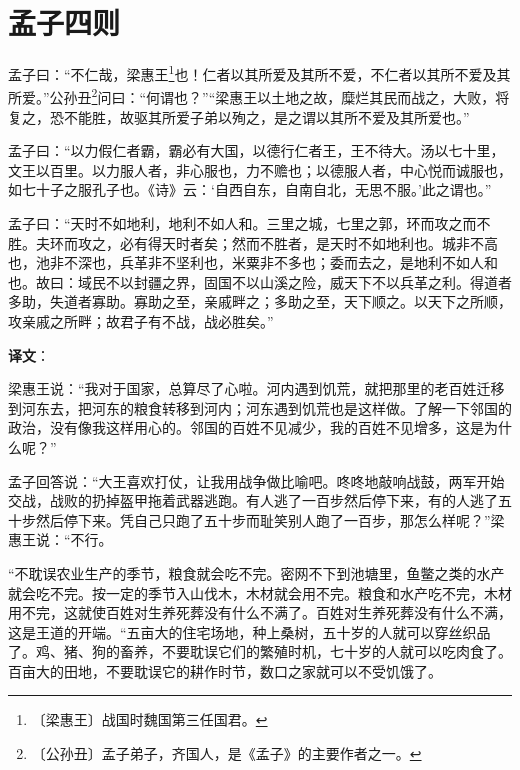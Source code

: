 \documentclass[12pt,UTF-8,openany]{ctexbook}
\begin{document}
\chapter{孟子四则}

\begin{normalsize}
    
    孟子曰：“不仁哉，梁惠王\footnote{〔梁惠王〕战国时魏国第三任国君。}也！仁者以其所爱及其所不爱，不仁者以其所不爱及其所爱。”公孙丑\footnote{〔公孙丑〕孟子弟子，齐国人，是《孟子》的主要作者之一。}问曰：“何谓也？”“梁惠王以土地之故，糜烂其民而战之，大败，将复之，恐不能胜，故驱其所爱子弟以殉之，是之谓以其所不爱及其所爱也。”
    
    孟子曰：“以力假仁者霸，霸必有大国，以德行仁者王，王不待大。汤以七十里，文王以百里。以力服人者，非心服也，力不赡也；以德服人者，中心悦而诚服也，如七十子之服孔子也。《诗》云：‘自西自东，自南自北，无思不服。’此之谓也。”
    
    孟子曰：“天时不如地利，地利不如人和。三里之城，七里之郭，环而攻之而不胜。夫环而攻之，必有得天时者矣；然而不胜者，是天时不如地利也。城非不高也，池非不深也，兵革非不坚利也，米粟非不多也；委而去之，是地利不如人和也。故曰：域民不以封疆之界，固国不以山溪之险，威天下不以兵革之利。得道者多助，失道者寡助。寡助之至，亲戚畔之；多助之至，天下顺之。以天下之所顺，攻亲戚之所畔；故君子有不战，战必胜矣。”
\end{normalsize}


\newpage

\textbf{译文}：

\vspace{1em}

\begin{normalsize}
    
    梁惠王说：“我对于国家，总算尽了心啦。河内遇到饥荒，就把那里的老百姓迁移到河东去，把河东的粮食转移到河内；河东遇到饥荒也是这样做。了解一下邻国的政治，没有像我这样用心的。邻国的百姓不见减少，我的百姓不见增多，这是为什么呢？”
    
    孟子回答说：“大王喜欢打仗，让我用战争做比喻吧。咚咚地敲响战鼓，两军开始交战，战败的扔掉盔甲拖着武器逃跑。有人逃了一百步然后停下来，有的人逃了五十步然后停下来。凭自己只跑了五十步而耻笑别人跑了一百步，那怎么样呢？”梁惠王说：“不行。
    
    “不耽误农业生产的季节，粮食就会吃不完。密网不下到池塘里，鱼鳖之类的水产就会吃不完。按一定的季节入山伐木，木材就会用不完。粮食和水产吃不完，木材用不完，这就使百姓对生养死葬没有什么不满了。百姓对生养死葬没有什么不满，这是王道的开端。“五亩大的住宅场地，种上桑树，五十岁的人就可以穿丝织品了。鸡、猪、狗的畜养，不要耽误它们的繁殖时机，七十岁的人就可以吃肉食了。百亩大的田地，不要耽误它的耕作时节，数口之家就可以不受饥饿了。
    
\end{normalsize}
\end{document}
